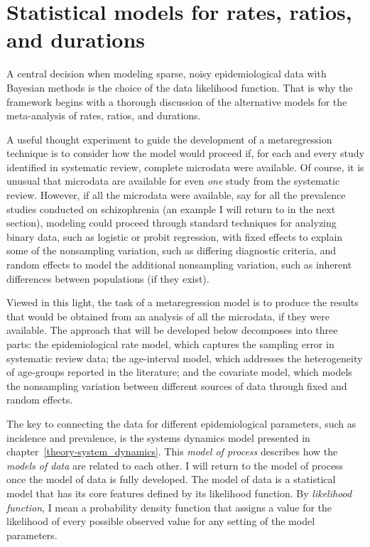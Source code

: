 \chapter{Statistical models for rates, ratios, and durations}
\label{theory-rate_model}

A central decision when modeling sparse, noisy epidemiological data
with Bayesian methods is the choice of the data likelihood function.
That is why the framework begins with a thorough discussion of the
alternative models for the meta-analysis of rates, ratios, and
durations.

A useful thought experiment to guide the development of
a metaregression technique is to consider how the model would proceed
if, for each and every study identified in systematic review, complete
microdata were available.  Of course, it is unusual that microdata are
available for even \emph{one} study from the systematic review.  However,
if all the microdata were available, say for all the prevalence
studies conducted on schizophrenia (an example I will return to in
the next section), modeling could proceed through standard techniques
for analyzing binary data, such as logistic or probit regression, with
fixed effects to explain some of the nonsampling variation, such as
differing diagnostic criteria, and random effects to model the
additional nonsampling variation, such as inherent differences
between populations (if they exist).

Viewed in this light, the task of a metaregression model is to
produce the results that would be obtained from an analysis of all the
microdata, if they were available. The approach that will be
developed below decomposes into three parts: the epidemiological rate
model, which captures the sampling error in systematic review data;
the age-interval model, which addresses the heterogeneity of age-groups
reported in the literature; and the covariate model, which
models the nonsampling variation between different sources of data
through fixed and random effects.

The key to connecting the data for different epidemiological
parameters, such as incidence and prevalence, is the systems dynamics
model presented in chapter~\ref{theory-system_dynamics}.  This \emph{model of
  process} describes how the \emph{models of data} are related to each
other.  I will return to the model of process once the model of data
is fully developed.  The model of data is a statistical model that
has its core features defined by its likelihood function.  By
\emph{likelihood function}, I mean a probability density function that
assigns a value for the likelihood of every possible observed value
for any setting of the model parameters.

